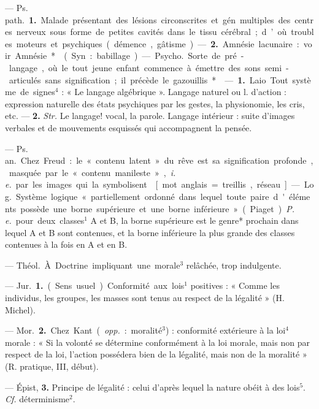 
	\begin{itemize}[leftmargin=1cm, label=, itemsep=1pt]

 — \si{Ps. path.} {\bf 1.} Malade
présentant des lésions circonscrites
et gén. multiples des centres nerveux sous forme de petites cavités
dans le tissu cérébral; d’où troubles
moteurs et psychiques (démence,
gâtisme). — {\bf 2.} Amnésie lacunaire :
voir Amnésie*.

 (Syn. : babillage). — \si{Psycho.}
Sorte de pré-langage, où le tout
jeune enfant commence à émettre
des sons semi-articulés sans signification ; il précède le gazouillis*.

 — {\bf 1.} Laio. Tout système de
signes$^4$ : « Le langage algébrique ».
Langage naturel ou l. d'action :
expression naturelle des états psychiques par les gestes, la physionomie, les cris, etc. — {\bf 2.} {\it Str.} Le
langage! vocal, la parole. Langage
intérieur : suite d'images verbales
et de mouvements esquissés qui
accompagnent la pensée.

 — \si{Ps. an.} Chez Freud : le
« contenu latent » du rêve est sa
signification profonde, masquée par
le « contenu manileste », {\it i. e.} par les
images qui la symbolisent.

 [mot anglais = treillis, réseau]
— \si{Log.} Système logique « partiellement ordonné dans lequel toute
paire d'éléments possède une borne
supérieure et une borne inférieure »
(Piaget). {\it P. e.} pour deux classes$^1$ A
et B, la borne supérieure est le
genre* prochain dans lequel A et B
sont contenues, et la borne inférieure la plus grande des classes
contenues à la fois en A et en B.

 — \si{Théol.} À. Doctrine impliquant une morale$^3$ relâchée, trop
indulgente.

 — \si{Jur.} {\bf 1.} (Sens usuel). Conformité aux lois$^1$ positives : « Comme
les individus, les groupes, les masses
sont tenus au respect de la légalité » (H. Michel).

— \si{Mor.} {\bf 2.} Chez Kant ({\it opp.} : moralité$^3$) : conformité extérieure à la
loi$^4$ morale : « Si la volonté se détermine conformément à la loi morale,
mais non par respect de la loi,
l’action possédera bien de la légalité, mais non de la moralité »
(R. pratique, III, début).

— Épist, {\bf 3.} Principe de légalité :
celui d’après lequel la nature obéit
à des lois$^5$. {\it Cf.} déterminisme$^2$.


\end{itemize}
